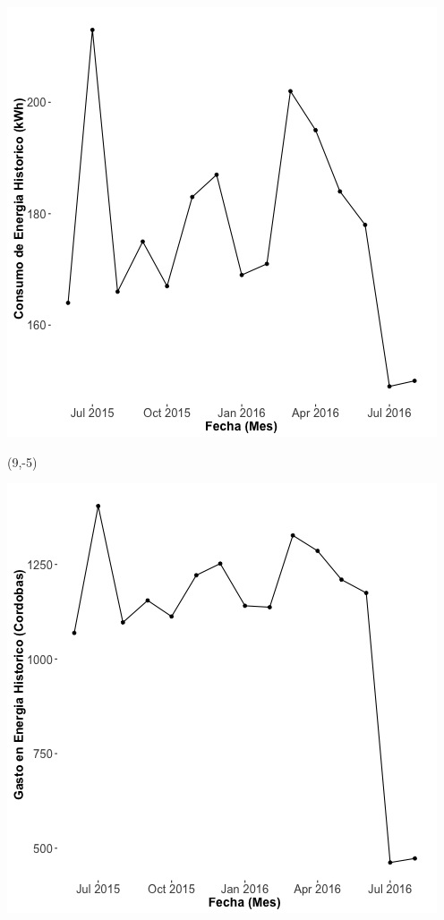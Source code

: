 \documentclass{article}\usepackage[]{graphicx}\usepackage[]{color}
\newenvironment{knitrout}{}{} %
\begin{document}
\begin{knitrout}
\color{fgcolor}
\includegraphics[scale=0.65]{figure/A7_historico_energia} 
\end{knitrout}

 \begin{textblock}{1}(9,-5)
\begin{minipage}{20em}
\begingroup

\endgroup
\end{minipage}
\end{textblock}

\begin{knitrout}
\color{fgcolor}
\includegraphics[scale=0.65]{figure/A7_historico_cordobas} 
\end{knitrout}
\end{document}
